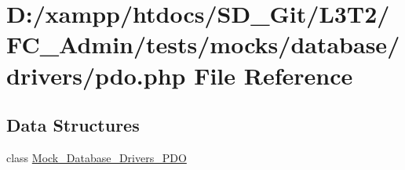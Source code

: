 \hypertarget{pdo_8php}{}\section{D\+:/xampp/htdocs/\+S\+D\+\_\+\+Git/\+L3\+T2/\+F\+C\+\_\+\+Admin/tests/mocks/database/drivers/pdo.php File Reference}
\label{pdo_8php}
\subsection*{Data Structures}
\begin{DoxyCompactItemize}
\item 
class \hyperlink{class_mock___database___drivers___p_d_o}{Mock\+\_\+\+Database\+\_\+\+Drivers\+\_\+\+P\+D\+O}
\end{DoxyCompactItemize}

